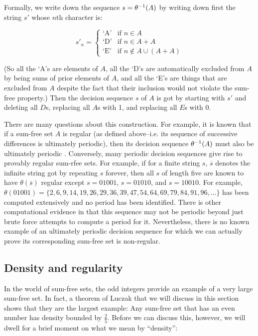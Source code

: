 \documentclass{report}
\theoremstyle{remark}
\numberwithin{equation}{section}
\begin{document}
Formally, we write down the sequence $s = \theta^{-1}(A)$ by writing
down first the string $s'$ whose $n$th character is: 

\[s'_n = \begin{cases}
\text{`A'}& \text{if } n \in A\\
\text{`D'}& \text{if } n \in A+A\\
\text{`E'}& \text{if } n \notin A \cup (A+A)
\end{cases}\]

(So all the `A's are elements of $A$, all the `D's are automatically
excluded from $A$ by being sums of prior elements of $A$, and all the
`E's are things that are excluded from $A$ despite the fact that their
inclusion would not violate the sum-free property.)  Then the decision
sequence $s$ of $A$ is got by starting with $s'$ and deleting all
$D$s, replacing all $A$s with 1, and replacing all $E$s with 0.

There are many questions about this construction.  For example, it is
known that if a sum-free set $A$ is regular (as defined
above--i.e. its sequence of successive differences is ultimately
periodic), then its decision sequence $\theta^{-1}(A)$ must also be
ultimately periodic \cite{cameron:sc1987}.  Conversely, many periodic
decision sequences give rise to provably regular sum-rfee sets.  For
example, if for a finite string $s$, $\overline{s}$ denotes the
infinite string got by repeating $s$ forever, then all $s$ of length
five are known to have $\theta(\overline{s})$ regular except
$s = 01001$, $s = 01010$, and $s = 10010$.  For example,
$\theta(01001) = \{2, 6, 9, 14, 19, 26, 29, 36, 39, 47, 54, 64, 69,
79, 84, 91, 96, \ldots\}$ has been computed extensively and no period
has been identified.  There is other computational evidence in
\cite{calkin:int2005} that this sequence may not be periodic beyond
just brute force attempts to compute a period for it.  Nevertheless,
there is no known example of an ultimately periodic decision sequence
for which we can actually prove its corresponding sum-free set is
non-regular.

\subsection{Density and regularity}

In the world of sum-free sets, the odd integers provide an example of
a very large sum-free set.  In fact, a theorem of Luczak that we will
discuss in this section shows that they are the largest example: Any
sum-free set that has an even number has density bounded by $\frac25$.
Before we can discuss this, however, we will dwell for a brief moment
on what we mean by ``density'':
\end{document}
